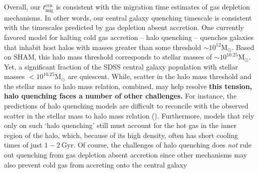 \documentclass[iop,apj,tighten,twocolappendix,numberedappendix]{emulateapj}
\begin{document}
Overall, our $t_\mathrm{mig}^\mathrm{cen}$ is consistent with the 
migration time estimates of gas depletion mechanisms. In other words, 
our central galaxy quenching timescale is consistent with 
the timescales predicted by gas depletion absent accretion. One currently favored model 
for halting cold gas accretion -- halo quenching -- quenches galaxies 
that inhabit host halos with masses greater than some threshold 
$\sim 10^{12}\mathrm{M}_\odot$. Based on SHAM, this halo mass threshold 
corresponds to stellar masses of $\sim 10^{10.25} \mathrm{M}_\odot$. 
Yet, a significant fraction of the SDSS central galaxy population 
with stellar masses $< 10^{10.25} \mathrm{M}_\odot$ are quiescent.  
While, scatter in the halo mass threshold and the stellar mass to 
halo mass relation, combined, may help resolve {\color{red} \bf this tension, halo quenching 
faces a number of other challenges.} For instance, the predictions of
halo quenching models are difficult to reconcile with the observed scatter
in the stellar mass to halo mass relation (\citealt{Tinker:2016aa}).
Furthermore, models that rely only on such ‘halo quenching’ still 
must account for the hot gas in the inner region of the halo, which, 
because of its high density, often has short cooling times of just $1-2~\mathrm{Gyr}$.
Of course, the challenges of halo quenching does {\em not} rule out 
quenching from gas depletion absent accretion since other mechanisms may 
also prevent cold gas from accreting onto the central galaxy 
\end{document}
